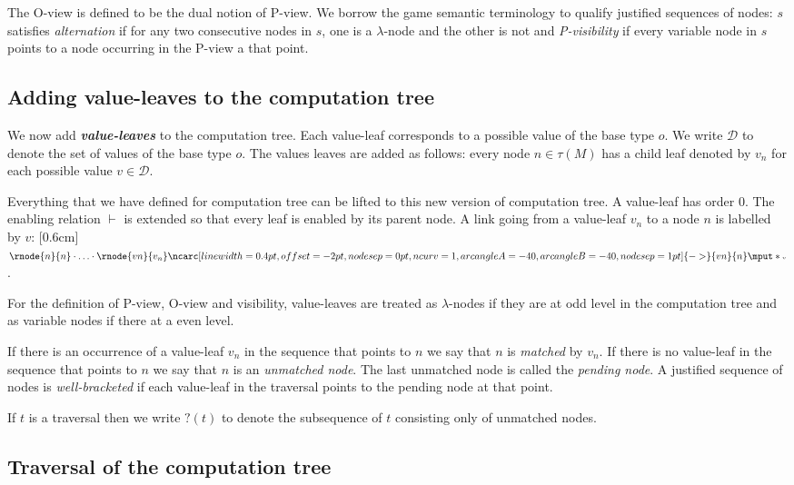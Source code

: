 \documentclass{llncs}
\newcommand\defname[1]{{\bf\em #1}\index{#1}}
\newcommand{\bkptr}[2][nodesep=0pt]{\ncarc[linewidth=0.4pt,offset=-2pt,nodesep=0pt,ncurv=1,arcangleA=-#2, arcangleB=-#2,#1]{->}}
\newcommand{\bklabel}[1]{\mput*{\mbox{{\tiny $#1$}}}}
\begin{document}
The O-view is defined to be the dual notion of P-view.
We borrow the game semantic terminology to qualify justified sequences of nodes:
$s$ satisfies \emph{alternation} if for any two consecutive nodes in $s$, one is a $\lambda$-node
and the other is not and \emph{P-visibility} if every variable node in $s$ points to a node occurring in the P-view a that point.

\subsection{Adding value-leaves to the computation tree}
\label{sec:adding_value_leaves}

We now add \defname{value-leaves} to the computation tree. Each
value-leaf corresponds to a possible value of the base type $o$.
We write $\mathcal{D}$ to denote the set of values of the base type
$o$. The values leaves are added as follows: every
node $n \in \tau(M)$ has a child leaf denoted by $v_n$ for each possible value $v \in \mathcal{D}$.

Everything that we have defined for computation tree can be lifted
to this new version of computation tree. A value-leaf has order $0$. The enabling relation $\vdash$ is
extended so that every leaf is enabled by its parent node.
A link going from a value-leaf $v_n$ to a node $n$ is labelled by $v$:
\raisebox{0cm}[0.6cm]{$\rnode{n}{n} \cdot \ldots \cdot \rnode{vn}{v_n} \bkptr[nodesep=1pt]{40}{vn}{n} \bklabel{v}$}.

For the definition of P-view, O-view and visibility, value-leaves are treated as
$\lambda$-nodes if they are at odd level in the computation tree and
as variable nodes if there at a even level.

If there is an occurrence of a value-leaf $v_n$ in the sequence that points to $n$ we say that
$n$ is \emph{matched} by $v_n$. If there is no value-leaf in the sequence that points to $n$ we
say that $n$ is an \emph{unmatched node}.
The last unmatched node is called the \emph{pending node}.
A justified sequence of nodes is \emph{well-bracketed} if each value-leaf in the traversal points to the pending node at that point.

If $t$ is a traversal then we write $?(t)$ to denote the subsequence of $t$ consisting only of unmatched nodes.

\subsection{Traversal of the computation tree}
\label{subsec:traversal}
\end{document}
